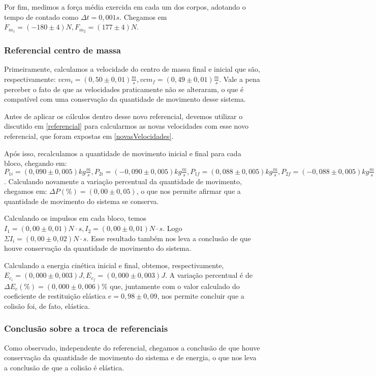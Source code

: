 \documentclass[12pt, twoside]{article}
\begin{document}
Por fim, medimos a força média exercida em cada um dos corpos, adotando o tempo de contado como $\Delta t = 0,001s$. Chegamos em $F_{m_1} = (-180\pm4)N, F_{m_2}=(177\pm4)N$.

\subsubsection{Referencial centro de massa}

Primeiramente, calculamos a velocidade do centro de massa final e inicial que são, respectivamente: $vcm_i = (0,50\pm0,01)\frac{m}{s}, vcm_f = (0,49\pm0,01)\frac{m}{s}$. Vale a pena perceber o fato de que as velocidades praticamente não se alteraram, o que é compatível com uma conservação da quantidade de movimento desse sistema.

Antes de aplicar os cálculos dentro desse novo referencial, devemos utilizar o discutido em \ref{referencial} para calcularmos as novas velocidades com esse novo referencial, que foram expostas em \ref{novasVelocidades}.

Após isso, recalculamos a quantidade de movimento inicial e final para cada bloco, chegando em: $P_{1i} = (0,090\pm0,005)kg \frac{m}{s}, P_{2i} = (-0,090\pm0,005) kg\frac{m}{s}, P_{1f} = (0,088\pm0,005) kg \frac{m}{s}, P_{2f} = (-0,088\pm0,005)kg \frac{m}{s}$. Calculando novamente a variação percentual da quantidade de movimento, chegamos em: $\Delta P(\%)=(0,00\pm0,05)$, o que nos permite afirmar que a quantidade de movimento do sistema se conserva.

Calculando os impulsos em cada bloco, temos $I_1 = (0,00\pm0,01)N\cdot s, I_2 = (0,00\pm0,01)N\cdot s$. Logo $\Sigma I_i = (0,00\pm0,02)N\cdot s$. Esse resultado também nos leva a conclusão de que houve conservação da quantidade de movimento do sistema.

Calculando a energia cinética inicial e final, obtemos, respectivamente, $E_{c_i} = (0,000\pm0,003)J, E_{c_f} = (0,000\pm0,003)J$. A variação percentual é de $\Delta E_c(\%) = (0,000\pm0,006)\%$ que, juntamente com o valor calculado do coeficiente de restituição elástica $e = 0,98\pm0,09$, nos permite concluir que a colisão foi, de fato, elástica.

\subsubsection{Conclusão sobre a troca de referenciais}

Como observado, independente do referencial, chegamos a conclusão de que houve conservação da quantidade de movimento do sistema e de energia, o que nos leva a conclusão de que a colisão é elástica.
\end{document}
